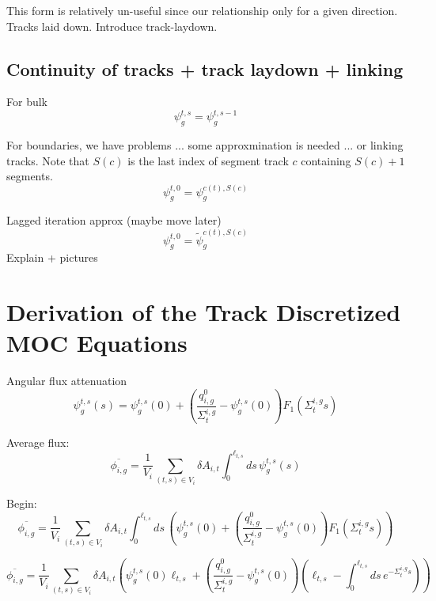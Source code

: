 This form is relatively un-useful since our relationship only for a given direction. Tracks laid down. Introduce track-laydown.

\subsection{Continuity of tracks + track laydown + linking}

For bulk
\begin{dmath}
	\psi_g^{t,s} = \psi_g^{t,s-1}
\end{dmath}

For boundaries, we have problems ... some approxmination is needed ... or linking tracks. Note that $S(c)$ is the last index of segment track $c$ containing $S(c) + 1$ segments.
\begin{dmath}
	\psi_g^{t,0} = \psi_g^{c(t),S(c)}
\end{dmath}

Lagged iteration approx (maybe move later)
\begin{dmath}
	\psi_g^{t,0} = \widetilde{\psi}_g^{c(t),S(c)}
\end{dmath}
Explain + pictures

\section{Derivation of the Track Discretized MOC Equations}

Angular flux attenuation
\begin{dmath}
	\psi_g^{t,s}(s) = \psi^{t,s}_g(0) + \left( \frac{q^0_{i,g}}{\Sigma_{t}^{i,g}} - \psi_g^{t,s}(0) \right) F_1\left(\Sigma_{t}^{i,g} s \right)
\end{dmath}

Average flux:
\begin{dmath}
	\overline{\phi_{i,g}} = \frac{1}{V_i} \sum_{(t,s) \in V_i} \delta A_{i,t} \int_{0}^{\ell_{t,s}} ds \, \psi^{t,s}_g(s)
\end{dmath}

Begin:
\begin{dmath}
	\overline{\phi_{i,g}} = \frac{1}{V_i} \sum_{(t,s) \in V_i} \delta A_{i,t} \int_{0}^{\ell_{t,s}} ds \,  \left(\psi^{t,s}_g(0) + \left( \frac{q^0_{i,g}}{\Sigma_{t}^{i,g}} - \psi_g^{t,s}(0) \right) F_1\left(\Sigma_{t}^{i,g} s \right) \right)
\end{dmath}

\begin{dmath}
	\overline{\phi_{i,g}} = \frac{1}{V_i} \sum_{(t,s) \in V_i} \delta A_{i,t} \left( \psi^{t,s}_g(0) \ell_{t,s} + \left( \frac{q^0_{i,g}}{\Sigma_{t}^{i,g}} - \psi_g^{t,s}(0) \right) \left( \ell_{t,s} - \int_{0}^{\ell_{t,s}} ds \, e^{-\Sigma_{t}^{i,g} s} \right) \right)
\end{dmath}

